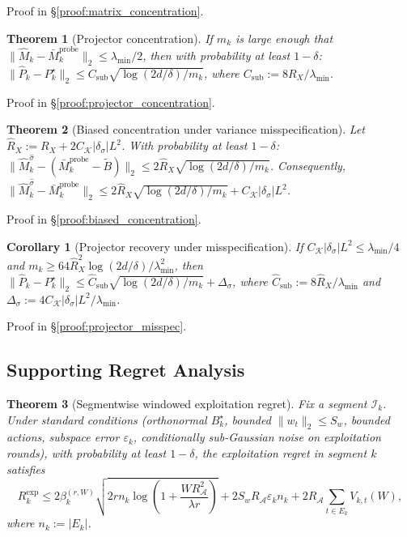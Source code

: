 \documentclass{article}
\newcommand{\cA}{\mathcal{A}}
\newcommand{\cI}{\mathcal{I}}
\newtheorem{theorem}{Theorem}
\newtheorem{corollary}{Corollary}
\begin{document}
Proof in \S\ref{proof:matrix_concentration}.

\begin{theorem}[Projector concentration]
\label{thm:projector_concentration_summary}
If $m_k$ is large enough that $\|\widehat M_k - \bar M_k^{\mathrm{probe}}\|_2 \le \lambda_{\min}/2$, then with probability at least $1-\delta$:
$\|\widehat{P}_k - P_k^\star\|_2 \le C_{\mathrm{sub}}\sqrt{\log(2d/\delta)/m_k}$, where $C_{\mathrm{sub}} := 8R_X/\lambda_{\min}$.
\end{theorem}

Proof in \S\ref{proof:projector_concentration}.

\begin{theorem}[Biased concentration under variance misspecification]
\label{thm:biased_concentration}
Let $\hat R_X := R_X + 2C_{\mathcal K}|\delta_\sigma|L^2$.
With probability at least $1-\delta$:
$\|\widehat M_k^{\hat\sigma} - (\bar M_k^{\mathrm{probe}} - \widetilde B)\|_2 \le 2\hat R_X\sqrt{\log(2d/\delta)/m_k}$.
Consequently, $\|\widehat M_k^{\hat\sigma} - \bar M_k^{\mathrm{probe}}\|_2 \le 2\hat R_X\sqrt{\log(2d/\delta)/m_k} + C_{\mathcal K}|\delta_\sigma|L^2$.
\end{theorem}

Proof in \S\ref{proof:biased_concentration}.

\begin{corollary}[Projector recovery under misspecification]
\label{cor:projector_misspec}
If $C_{\mathcal K}|\delta_\sigma|L^2 \le \lambda_{\min}/4$ and $m_k \ge 64\hat R_X^2\log(2d/\delta)/\lambda_{\min}^2$, then
$\|\widehat P_k - P_k^\star\|_2 \le \hat C_{\mathrm{sub}}\sqrt{\log(2d/\delta)/m_k} + \Delta_\sigma$,
where $\hat C_{\mathrm{sub}} := 8\hat R_X/\lambda_{\min}$ and $\Delta_\sigma := 4C_{\mathcal K}|\delta_\sigma|L^2/\lambda_{\min}$.
\end{corollary}

Proof in \S\ref{proof:projector_misspec}.

\subsection{Supporting Regret Analysis}
\label{app:supporting_regret}

\begin{theorem}[Segmentwise windowed exploitation regret]
\label{thm:segment_windowed_projected}
Fix a segment $\cI_k$. Under standard conditions (orthonormal $B_k^\star$, bounded $\|w_t\|_2 \le S_w$, bounded actions, subspace error $\varepsilon_k$, conditionally sub-Gaussian noise on exploitation rounds), with probability at least $1-\delta$, the exploitation regret in segment $k$ satisfies
\[
R_k^{\mathrm{exp}} \le
2\beta_k^{(r,W)}
\sqrt{2r n_k \log\!\left(1+\frac{W R_{\cA}^2}{\lambda r}\right)}
+ 2S_wR_{\cA} \varepsilon_k n_k
+ 2R_{\cA} \sum_{t\in E_k} V_{k,t}(W),
\]
where $n_k:=|E_k|$.
\end{theorem}
\end{document}
